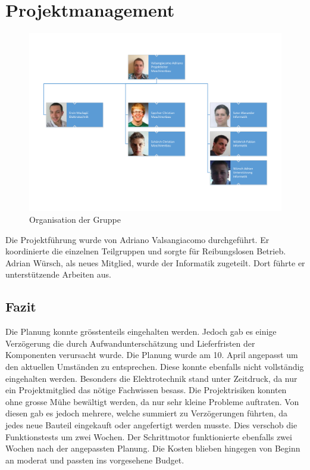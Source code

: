 \section{Projektmanagement}

\begin{figure}[h!]
	\centering
	\includegraphics[width=1.0\linewidth]{../../fig/Organigramm.pdf}
	\caption{Organisation der Gruppe}
	\label{fig:Organigramm}
\end{figure}

\noindent
Die Projektführung wurde von Adriano Valsangiacomo durchgeführt. Er
koordinierte die einzelnen Teilgruppen und sorgte für Reibungslosen
Betrieb. Adrian Würsch, als neues Mitglied, wurde der Informatik
zugeteilt. Dort führte er unterstützende Arbeiten aus.

\newpage

\newpage

\newpage


\newpage
\subsection{Fazit}

Die Planung konnte grösstenteils eingehalten werden. Jedoch gab es einige Verzögerung die durch Aufwandunterschätzung und Lieferfristen der Komponenten verursacht wurde. Die Planung wurde am 10. April angepasst um den aktuellen Umständen zu entsprechen. Diese konnte ebenfalls nicht vollständig eingehalten werden. Besonders die Elektrotechnik stand unter Zeitdruck, da nur ein Projektmitglied das nötige Fachwissen besass.
Die Projektrisiken konnten ohne grosse Mühe bewältigt werden, da nur sehr kleine Probleme auftraten.
Von diesen gab es jedoch mehrere, welche summiert zu Verzögerungen führten, da jedes neue Bauteil eingekauft oder angefertigt werden musste. Dies verschob die Funktionstests um zwei Wochen.
Der Schrittmotor funktionierte ebenfalls zwei Wochen nach der angepassten Planung.
Die Kosten blieben hingegen von Beginn an moderat und passten ins vorgesehene Budget.
